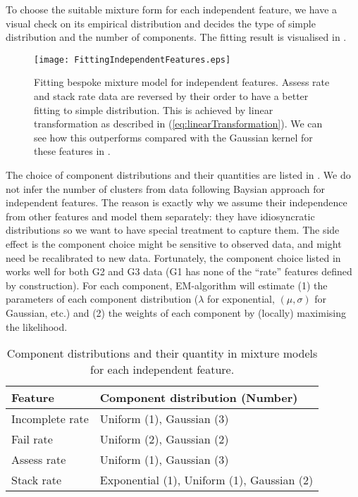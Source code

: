 \vspace*{-0.9cm}
To choose the suitable mixture form for each independent feature, we have a visual check on its empirical distribution and decides the type of simple distribution and the number of components. The fitting result is visualised in .

\begin{figure}[!h]
\centering
\texttt{[image: FittingIndependentFeatures.eps]}
\caption{Fitting bespoke mixture model for independent features. Assess rate and stack rate data are reversed by their order to have a better fitting to simple distribution. This is achieved by linear transformation as described in (\ref{eq:linearTransformation}). We can see how this outperforms compared with the Gaussian kernel for these features in . }
\label{fig:fitIndependentFeature}
\end{figure}

The choice of component distributions and their quantities are listed in . We do not infer the number of clusters from data following Baysian approach for independent features. The reason is exactly why we assume their independence from other features and model them separately: they have idiosyncratic distributions so we want to have special treatment to capture them. The side effect is the component choice might be sensitive to observed data, and might need be recalibrated to new data. Fortunately, the component choice listed in  works well for both G2 and G3 data (G1 has none of the ``rate'' features defined by construction). For each component, EM-algorithm will estimate (1) the parameters of each component distribution ($\lambda$ for exponential, $(\mu, \sigma)$ for Gaussian, etc.) and (2) the weights of each component by (locally) maximising the likelihood.

\begin{table}[!h]
\centering
\footnotesize
\begin{tabular}{p{3cm}|p{7cm}}
\hline
\textbf{Feature} & \textbf{Component distribution (Number)} \\
\hline
Incomplete rate &
Uniform (1), Gaussian (3) \\
\hline
Fail rate &
Uniform (2), Gaussian (2) \\
\hline
Assess rate &
Uniform (1), Gaussian (3) \\
\hline
Stack rate &
Exponential (1), Uniform (1), Gaussian (2) \\
\hline
\end{tabular}
\caption{Component distributions and their quantity in mixture models for each independent feature.}
\label{tab:fitIndependentFeature}
\end{table}

